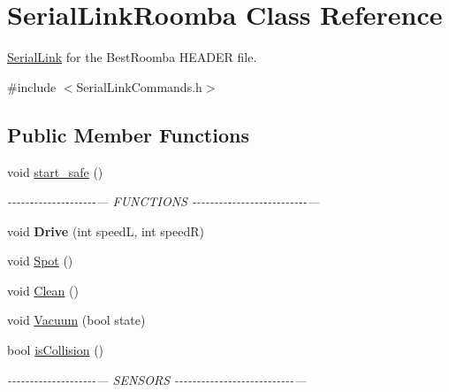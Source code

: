 \hypertarget{class_serial_link_roomba}{}\section{Serial\+Link\+Roomba Class Reference}
\label{class_serial_link_roomba}


\mbox{\hyperlink{class_serial_link}{Serial\+Link}} for the Best\+Roomba H\+E\+A\+D\+ER file.  




{\ttfamily \#include $<$Serial\+Link\+Commands.\+h$>$}

\subsection*{Public Member Functions}
\begin{DoxyCompactItemize}
\item 
\mbox{\label{class_serial_link_roomba_a536844bfafe880f566cc1f8abc93cbde}} 
void \mbox{\hyperlink{class_serial_link_roomba_a536844bfafe880f566cc1f8abc93cbde}{start\+\_\+safe}} ()
\begin{DoxyCompactList}\small\item\em -\/-\/-\/-\/-\/-\/-\/-\/-\/-\/-\/-\/-\/-\/-\/-\/-\/-\/-\/-\/--- F\+U\+N\+C\+T\+I\+O\+NS -\/-\/-\/-\/-\/-\/-\/-\/-\/-\/-\/-\/-\/-\/-\/-\/-\/-\/-\/-\/-\/-\/-\/-\/-\/-\/--- \end{DoxyCompactList}\item 
\mbox{\label{class_serial_link_roomba_ad82450a39ad2d2688f495a0798d784c0}} 
void {\bfseries Drive} (int speedL, int speedR)
\item 
void \mbox{\hyperlink{class_serial_link_roomba_a8f5da920bc06886a0d02b5e1fe519fd6}{Spot}} ()
\item 
void \mbox{\hyperlink{class_serial_link_roomba_abb7f3a45935604914a96ea97cb7e6f59}{Clean}} ()
\item 
void \mbox{\hyperlink{class_serial_link_roomba_ab9d56883a0b905cc4ed67adb5bf74ff3}{Vacuum}} (bool state)
\item 
\mbox{\label{class_serial_link_roomba_aeac6d1c2769d0ee7d1fd567fce6a57d0}} 
bool \mbox{\hyperlink{class_serial_link_roomba_aeac6d1c2769d0ee7d1fd567fce6a57d0}{is\+Collision}} ()
\begin{DoxyCompactList}\small\item\em -\/-\/-\/-\/-\/-\/-\/-\/-\/-\/-\/-\/-\/-\/-\/-\/-\/-\/-\/-\/--- S\+E\+N\+S\+O\+RS -\/-\/-\/-\/-\/-\/-\/-\/-\/-\/-\/-\/-\/-\/-\/-\/-\/-\/-\/-\/-\/-\/-\/-\/-\/-\/-\/--- \end{DoxyCompactList}\item 

\end{DoxyCompactItemize}
